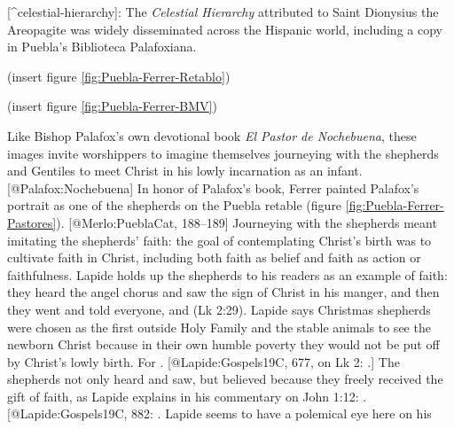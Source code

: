 [^celestial-hierarchy]:
The \emph{Celestial Hierarchy} attributed to Saint Dionysius the Areopagite was
widely disseminated across the Hispanic world, including a copy in Puebla's
Biblioteca Palafoxiana.

(insert figure \ref{fig:Puebla-Ferrer-Retablo})
\label{fig:Puebla-Ferrer-Retablo}

(insert figure \ref{fig:Puebla-Ferrer-BMV})
\label{fig:Puebla-Ferrer-BMV}

Like Bishop Palafox's own devotional book \emph{El Pastor de Nochebuena}, these
images invite worshippers to imagine themselves journeying with the shepherds
and Gentiles to meet Christ in his lowly incarnation as an infant.
[@Palafox:Nochebuena]
In honor of Palafox's book, Ferrer painted Palafox's portrait as one of the
shepherds on the Puebla retable (figure \ref{fig:Puebla-Ferrer-Pastores}).
[@Merlo:PueblaCat, 188--189]
Journeying with the shepherds meant imitating the shepherds' faith: the goal of
contemplating Christ's birth was to cultivate faith in Christ, including both
faith as belief and faith as action or faithfulness.
Lapide holds up the shepherds to his readers as an example of faith: they heard
the angel chorus and saw the sign of Christ in his manger, and then they went
and told everyone, and  (Lk 2:29).
Lapide says Christmas shepherds were chosen as the first outside Holy Family and
the stable animals to see the newborn Christ because in their own humble poverty
they would not be put off by Christ's lowly birth.
For . 
[@Lapide:Gospels19C, 677, on Lk 2: 
.]
The shepherds not only heard and saw, but believed because they freely received
the gift of faith, as Lapide explains in his commentary on John 1:12:
.
[@Lapide:Gospels19C, 882: 
. Lapide seems to have a polemical eye here on his
